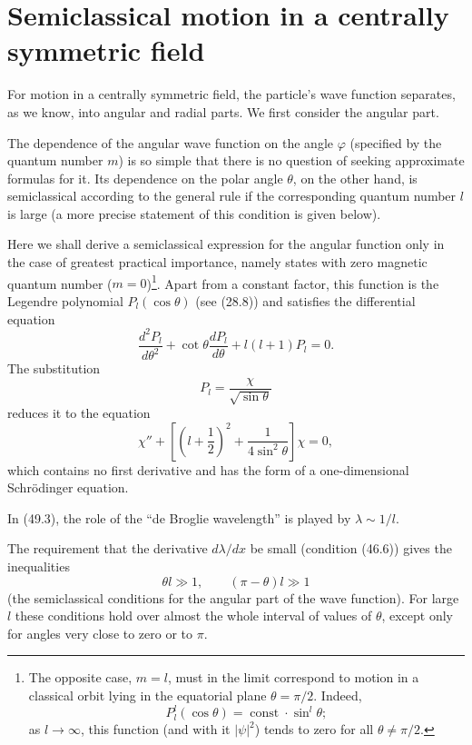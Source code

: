 \section{Semiclassical motion in a centrally symmetric field}

For motion in a centrally symmetric field, the particle's wave function
separates, as we know, into angular and radial parts. We first consider the
angular part.

The dependence of the angular wave function on the angle $\varphi$ (specified
by the quantum number $m$) is so simple that there is no question of seeking
approximate formulas for it. Its dependence on the polar angle $\theta$, on
the other hand, is semiclassical according to the general rule if the
corresponding quantum number $l$ is large (a more precise statement of this
condition is given below).

Here we shall derive a semiclassical expression for the angular function only
in the case of greatest practical importance, namely states with zero magnetic
quantum number ($m=0$)\footnote{The opposite case, $m=l$, must in the limit
correspond to motion in a classical orbit lying in the equatorial plane
$\theta=\pi/2$. Indeed,
\[
  P_l^l(\cos\theta)=\operatorname{const}\cdot\sin^l\theta;
\]
as $l\to\infty$, this function (and with it $|\psi|^2$) tends to zero for all
$\theta\ne\pi/2$.}. Apart from a constant factor, this function is the
Legendre polynomial $P_l(\cos\theta)$ (see (28.8)) and satisfies the
differential equation
\begin{equation}
  \frac{d^2P_l}{d\theta^2}+\cot\theta\frac{dP_l}{d\theta}
  +l(l+1)P_l=0.
  \tag{49.1}
\end{equation}
The substitution
\begin{equation}
  P_l=\frac{\chi}{\sqrt{\sin\theta}}
  \tag{49.2}
\end{equation}
reduces it to the equation
\begin{equation}
  \chi''+\left[\left(l+\frac12\right)^2+
  \frac{1}{4\sin^2\theta}\right]\chi=0,
  \tag{49.3}
\end{equation}
which contains no first derivative and has the form of a one-dimensional
Schrödinger equation.

In (49.3), the role of the ``de Broglie wavelength'' is played by
$\lambda\sim1/l$.

The requirement that the derivative $d\lambda/dx$ be small (condition (46.6))
gives the inequalities
\begin{equation}
  \theta l\gg1,\qquad(\pi-\theta)l\gg1
  \tag{49.4}
\end{equation}
(the semiclassical conditions for the angular part of the wave function). For
large $l$ these conditions hold over almost the whole interval of values of
$\theta$, except only for angles very close to zero or to $\pi$.

